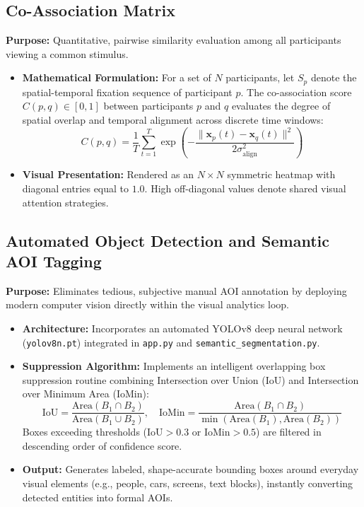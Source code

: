 \documentclass[11pt,a4paper]{article}
\begin{document}
\subsection{Co-Association Matrix}
\textbf{Purpose:} Quantitative, pairwise similarity evaluation among all participants viewing a common stimulus.
\begin{itemize}[noitemsep,topsep=2pt]
    \item \textbf{Mathematical Formulation:} For a set of $N$ participants, let $S_p$ denote the spatial-temporal fixation sequence of participant $p$. The co-association score $C(p, q) \in [0, 1]$ between participants $p$ and $q$ evaluates the degree of spatial overlap and temporal alignment across discrete time windows:
    \begin{equation}
        C(p, q) = \frac{1}{T} \sum_{t=1}^{T} \exp\left( - \frac{\|\mathbf{x}_p(t) - \mathbf{x}_q(t)\|^2}{2\sigma_{\text{align}}^2} \right)
    \end{equation}
    \item \textbf{Visual Presentation:} Rendered as an $N \times N$ symmetric heatmap with diagonal entries equal to $1.0$. High off-diagonal values denote shared visual attention strategies.
\end{itemize}

\subsection{Automated Object Detection and Semantic AOI Tagging}
\textbf{Purpose:} Eliminates tedious, subjective manual AOI annotation by deploying modern computer vision directly within the visual analytics loop.
\begin{itemize}[noitemsep,topsep=2pt]
    \item \textbf{Architecture:} Incorporates an automated YOLOv8 deep neural network (\texttt{yolov8n.pt}) integrated in \texttt{app.py} and \texttt{semantic\_segmentation.py}.
    \item \textbf{Suppression Algorithm:} Implements an intelligent overlapping box suppression routine combining Intersection over Union (IoU) and Intersection over Minimum Area ($\text{IoMin}$):
    \begin{equation}
        \text{IoU} = \frac{\text{Area}(B_1 \cap B_2)}{\text{Area}(B_1 \cup B_2)}, \quad \text{IoMin} = \frac{\text{Area}(B_1 \cap B_2)}{\min(\text{Area}(B_1), \text{Area}(B_2))}
    \end{equation}
    Boxes exceeding thresholds ($\text{IoU} > 0.3$ or $\text{IoMin} > 0.5$) are filtered in descending order of confidence score.
    \item \textbf{Output:} Generates labeled, shape-accurate bounding boxes around everyday visual elements (e.g., people, cars, screens, text blocks), instantly converting detected entities into formal AOIs.
\end{itemize}
\end{document}
